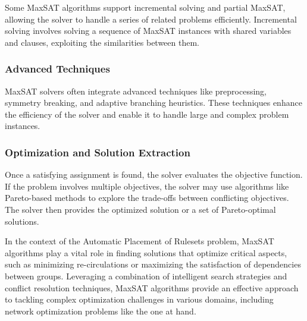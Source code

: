 Some MaxSAT algorithms support incremental solving and partial MaxSAT, allowing the solver to handle a series of related problems efficiently. Incremental solving involves solving a sequence of MaxSAT instances with shared variables and clauses, exploiting the similarities between them.

\subsubsection{Advanced Techniques}

MaxSAT solvers often integrate advanced techniques like preprocessing, symmetry breaking, and adaptive branching heuristics. These techniques enhance the efficiency of the solver and enable it to handle large and complex problem instances.

\subsubsection{Optimization and Solution Extraction}

Once a satisfying assignment is found, the solver evaluates the objective function. If the problem involves multiple objectives, the solver may use algorithms like Pareto-based methods to explore the trade-offs between conflicting objectives. The solver then provides the optimized solution or a set of Pareto-optimal solutions.

In the context of the Automatic Placement of Rulesets problem, MaxSAT algorithms play a vital role in finding solutions that optimize critical aspects, such as minimizing re-circulations or maximizing the satisfaction of dependencies between groups. Leveraging a combination of intelligent search strategies and conflict resolution techniques, MaxSAT algorithms provide an effective approach to tackling complex optimization challenges in various domains, including network optimization problems like the one at hand.
